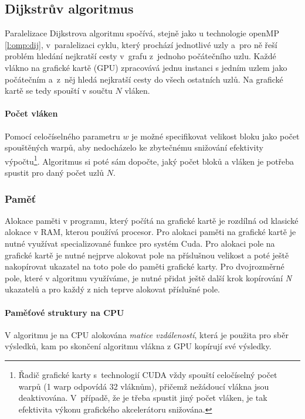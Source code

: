\subsection{Dijkstrův algoritmus}
Paralelizace Dijkstrova algoritmu spočívá, stejně jako u technologie openMP \ref{l:omp:dij}, v~paralelizaci cyklu, který prochází jednotlivé uzly a~pro ně řeší problém hledání nejkratší cesty v~grafu z~jednoho počátečního uzlu. Každé vlákno na grafické kartě (GPU) \cite{w:gpu} zpracovává jednu instanci s jedním uzlem jako počátečním a~z~něj hledá nejkratší cesty do všech ostatních uzlů. Na grafické kartě se tedy spouští v součtu $N$ vláken.

\paragraph{Počet vláken} \label{l:cuda:dijkstra:vlakna}
Pomocí celočíselného parametru $w$ je možné specifikovat velikost bloku jako počet spouštěných warpů, aby nedocházelo ke zbytečnému snižování efektivity výpočtu\footnote{Řadič grafické karty s~technologií CUDA vždy spouští celočíselný počet warpů (1 warp odpovídá 32 vláknům), přičemž nežádoucí vlákna jsou deaktivována. V~případě, že je třeba spustit jiný počet vláken, je tak efektivita výkonu grafického akcelerátoru snižována.}. Algoritmus si poté sám dopočte, jaký počet bloků a vláken je potřeba spustit pro daný počet uzlů $N$. 

\subsubsection{Paměť}
Alokace paměti v programu, který počítá na grafické kartě je rozdílná od klasické alokace v RAM, kterou používá procesor. Pro alokaci paměti na grafické kartě je nutné využívat specializované funkce pro systém Cuda. Pro alokaci pole na grafické kartě je nutné nejprve alokovat pole na příslušnou velikost a poté ještě nakopírovat ukazatel na toto pole do paměti grafické karty. Pro dvojrozměrné pole, které v algoritmu využíváme, je nutné přidat ještě další krok kopírování \textit{N} ukazatelů a pro každý z nich teprve alokovat příslušné pole.

\paragraph{Paměťové struktury na CPU}
V algoritmu je na CPU alokována \textit{matice vzdáleností}, která je použita pro sběr výsledků, kam po skončení algoritmu vlákna z GPU kopírují své výsledky.

